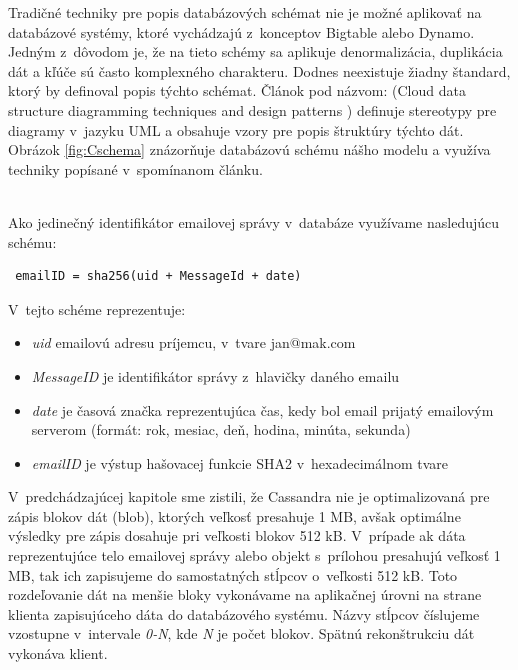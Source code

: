 \documentclass[11pt,twoside,a4paper]{book}
\begin{document}
Tradičné techniky pre popis databázových schémat nie je možné aplikovať na databázové systémy, ktoré vychádzajú z~konceptov Bigtable alebo Dynamo. Jedným z~dôvodom je, že na tieto schémy sa aplikuje denormalizácia, duplikácia dát a kľúče sú často komplexného charakteru. Dodnes neexistuje žiadny štandard, ktorý by definoval popis týchto schémat. Článok pod názvom:  (Cloud data structure diagramming techniques and design patterns \cite{CloudDataStructureDiag}) definuje stereotypy pre diagramy v~jazyku UML a obsahuje vzory pre popis štruktúry týchto dát. Obrázok \ref{fig:Cschema} znázorňuje databázovú schému nášho modelu a využíva techniky popísané v~spomínanom článku.

\noindent
\\
Ako jedinečný identifikátor emailovej správy v~databáze využívame nasledujúcu schému:
\begin{verbatim}
 emailID = sha256(uid + MessageId + date)
\end{verbatim}

\noindent
V~tejto schéme reprezentuje:
\begin{itemize}
 \item \emph{uid} emailovú adresu príjemcu, v~tvare jan@mak.com
 \item \emph{MessageID} je identifikátor správy z~hlavičky daného emailu
 \item \emph{date} je časová značka reprezentujúca čas, kedy bol email prijatý emailovým serverom (formát: rok, mesiac, deň, hodina, minúta, sekunda)
 \item \emph{emailID} je výstup hašovacej funkcie SHA2 v~hexadecimálnom tvare
\end{itemize}


V~predchádzajúcej kapitole sme zistili, že Cassandra nie je optimalizovaná pre zápis blokov dát (blob), ktorých veľkosť presahuje 1 MB, avšak optimálne výsledky pre zápis dosahuje pri veľkosti blokov 512 kB. V~prípade ak dáta reprezentujúce telo emailovej správy alebo objekt s~prílohou presahujú veľkosť 1 MB, tak ich zapisujeme do samostatných stĺpcov o~veľkosti 512 kB. Toto rozdeľovanie dát na menšie bloky vykonávame na aplikačnej úrovni na strane klienta zapisujúceho dáta do databázového systému. Názvy stĺpcov číslujeme vzostupne v~intervale \emph{0-N}, kde \emph{N} je počet blokov. Spätnú rekonštrukciu dát vykonáva klient.
\end{document}
